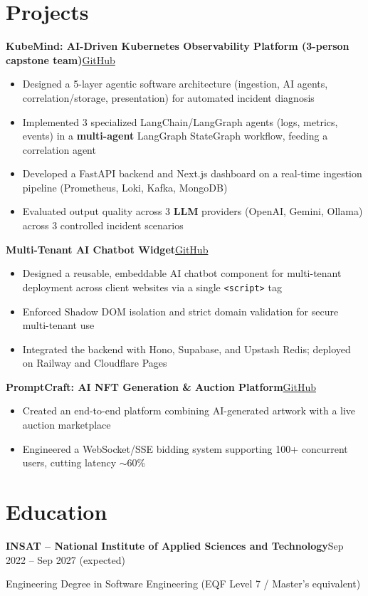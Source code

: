 \documentclass[10pt,a4paper]{article}
\newcommand{\entry}[2]{\vspace{1pt}\noindent\textbf{#1}\hfill{\color{muted}#2}\par}
\newcommand{\gh}[1]{\href{https://github.com/Hsan003/#1}{GitHub}}
\begin{document}
\section{Projects}
\entry{KubeMind: AI-Driven Kubernetes Observability Platform (3-person capstone team)}{\gh{kubemind}}
\begin{itemize}
  \item Designed a 5-layer agentic software architecture (ingestion, AI agents, correlation/storage, presentation) for automated incident diagnosis
  \item Implemented 3 specialized LangChain/LangGraph agents (logs, metrics, events) in a \textbf{multi-agent} LangGraph StateGraph workflow, feeding a correlation agent
  \item Developed a FastAPI backend and Next.js dashboard on a real-time ingestion pipeline (Prometheus, Loki, Kafka, MongoDB)
  \item Evaluated output quality across 3 \textbf{LLM} providers (OpenAI, Gemini, Ollama) across 3 controlled incident scenarios
\end{itemize}
\entry{Multi-Tenant AI Chatbot Widget}{\gh{AI-Assistant-Backend}}
\begin{itemize}
  \item Designed a reusable, embeddable AI chatbot component for multi-tenant deployment across client websites via a single \texttt{<script>} tag
  \item Enforced Shadow DOM isolation and strict domain validation for secure multi-tenant use
  \item Integrated the backend with Hono, Supabase, and Upstash Redis; deployed on Railway and Cloudflare Pages
\end{itemize}
\entry{PromptCraft: AI NFT Generation \& Auction Platform}{\gh{prompt-craft-back}}
\begin{itemize}
  \item Created an end-to-end platform combining AI-generated artwork with a live auction marketplace
  \item Engineered a WebSocket/SSE bidding system supporting 100+ concurrent users, cutting latency $\sim$60\%
\end{itemize}

\section{Education}
\entry{INSAT -- National Institute of Applied Sciences and Technology}{Sep 2022 -- Sep 2027 (expected)}
Engineering Degree in Software Engineering (EQF Level 7 / Master's equivalent)
\end{document}
